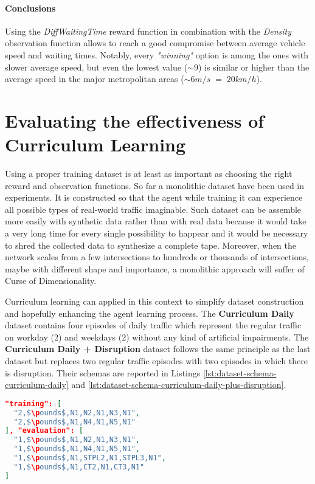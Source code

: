 \paragraph{Conclusions}

Using the \textit{DiffWaitingTime} reward function in combination with the \textit{Density} observation function allows to reach a good compromise between average vehicle speed and waiting times.
Notably, every \textit{"winning"} option is among the ones with slower average speed, but even the lowest value ($\sim9$) is similar or higher than the average speed in the major metropolitan areas ($\sim 6 m/s \; = \; 20 km/h$).

\section{Evaluating the effectiveness of Curriculum Learning}

Using a proper training dataset is at least as important as choosing the right reward and observation functions.
So far a monolithic dataset have been used in experiments.
It is constructed so that the agent while training it can experience all possible types of real-world traffic imaginable.
Such dataset can be assemble more easily with synthetic data rather than with real data because it would take a very long time for every single possibility to happear and it would be necessary to shred the collected data to synthesize a complete tape.
Moreover, when the network scales from a few intersections to hundreds or thousands of intersections, maybe with different shape and importance, a monolithic approach will suffer of Curse of Dimensionality.

Curriculum learning can applied in this context to simplify dataset construction and hopefully enhancing the agent learning process.
The \textbf{Curriculum Daily} dataset contains four episodes of daily traffic which represent the regular traffic on workday (2) and weekdays (2) without any kind of artificial impairments.
The \textbf{Curriculum Daily + Disruption} dataset follows the same principle as the last dataset but replaces two regular traffic episodes with two episodes in which there is disruption.
Their schemas are reported in Listings \ref{lst:dataset-schema-curriculum-daily} and \ref{lst:dataset-schema-curriculum-daily-plus-disruption}.

\noindent
\begin{minipage}{\linewidth}
\begin{lstlisting}[language=JSON, caption=The schema for the "Curriculum Daily" Dataset, label={lst:dataset-schema-curriculum-daily}, mathescape=true]
"training": [
  "2,$\pounds$,N1,N2,N1,N3,N1",
  "2,$\pounds$,N1,N4,N1,N5,N1"
], "evaluation": [
  "1,$\pounds$,N1,N2,N1,N3,N1",
  "1,$\pounds$,N1,N4,N1,N5,N1",
  "1,$\pounds$,N1,STPL2,N1,STPL3,N1",
  "1,$\pounds$,N1,CT2,N1,CT3,N1"
]
\end{lstlisting}
\end{minipage}

